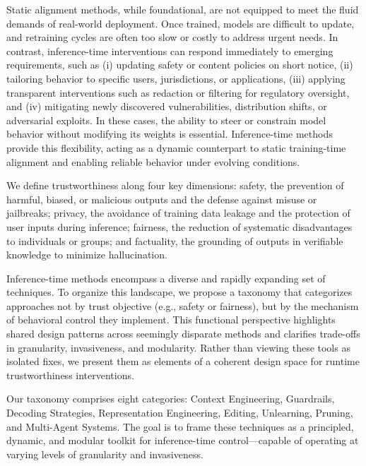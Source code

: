 {Static alignment methods, while foundational, are not equipped to meet the fluid demands of real-world deployment. Once trained, models are difficult to update, and retraining cycles are often too slow or costly to address urgent needs. In contrast, inference-time interventions can respond immediately to emerging requirements, such as (i) updating safety or content policies on short notice, (ii) tailoring behavior to specific users, jurisdictions, or applications, (iii) applying transparent interventions such as redaction or filtering for regulatory oversight, and (iv) mitigating newly discovered vulnerabilities, distribution shifts, or adversarial exploits. In these cases, the ability to steer or constrain model behavior without modifying its weights is essential. Inference-time methods provide this flexibility, acting as a dynamic counterpart to static training-time alignment and enabling reliable behavior under evolving conditions.

We define trustworthiness along four key dimensions: safety, the prevention of harmful, biased, or malicious outputs and the defense against misuse or jailbreaks; privacy, the avoidance of training data leakage and the protection of user inputs during inference; fairness, the reduction of systematic disadvantages to individuals or groups; and factuality, the grounding of outputs in verifiable knowledge to minimize hallucination.

Inference-time methods encompass a diverse and rapidly expanding set of techniques. To organize this landscape, we propose a taxonomy that categorizes approaches not by trust objective (e.g., safety or fairness), but by the mechanism of behavioral control they implement. This functional perspective highlights shared design patterns across seemingly disparate methods and clarifies trade-offs in granularity, invasiveness, and modularity. Rather than viewing these tools as isolated fixes, we present them as elements of a coherent design space for runtime trustworthiness interventions.

Our taxonomy comprises eight categories: Context Engineering, Guardrails, Decoding Strategies, Representation Engineering, Editing, Unlearning, Pruning, and Multi-Agent Systems. The goal is to frame these techniques as a principled, dynamic, and modular toolkit for inference-time control—capable of operating at varying levels of granularity and invasiveness.

}
